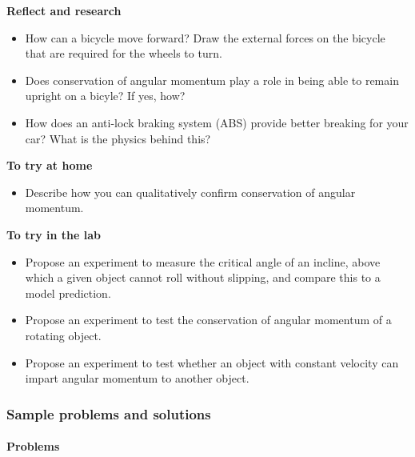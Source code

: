 \begin{framed}
\textbf{Reflect and research}\\
\begin{itemize}
\item How can a bicycle move forward? Draw the external forces on the bicycle that are required for the wheels to turn.
\item Does conservation of angular momentum play a role in being able to remain upright on a bicyle? If yes, how?
\item How does an anti-lock braking system (ABS) provide better breaking for your car? What is the physics behind this?
\end{itemize}
\end{framed}

\begin{framed}
\textbf{To try at home}\\
\begin{itemize}
\item Describe how you can qualitatively confirm conservation of angular momentum.
\end{itemize}
\end{framed}

\begin{framed}
\textbf{To try in the lab}\\
\begin{itemize}
\item Propose an experiment to measure the critical angle of an incline, above which a given object cannot roll without slipping, and compare this to a model prediction.
\item Propose an experiment to test the conservation of angular momentum of a rotating object.
\item Propose an experiment to test whether an object with constant velocity can impart angular momentum to another object.
\end{itemize}
\end{framed}

\subsubsection{Sample problems and solutions}

\paragraph{Problems}

